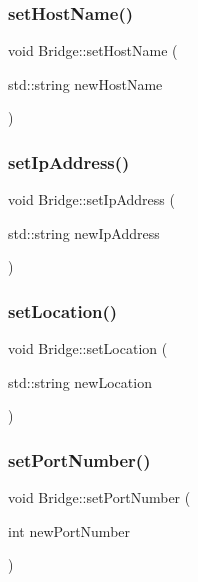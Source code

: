 \subsubsection{\texorpdfstring{set\+Host\+Name()}{setHostName()}}
{\footnotesize\ttfamily void Bridge\+::set\+Host\+Name (\begin{DoxyParamCaption}\item[{std\+::string}]{new\+Host\+Name }\end{DoxyParamCaption})\hspace{0.3cm}{\ttfamily [inline]}}

\mbox{\label{class_bridge_aa4fd7375d4b6092ca8bbee093dcc1a27}} 
\subsubsection{\texorpdfstring{set\+Ip\+Address()}{setIpAddress()}}
{\footnotesize\ttfamily void Bridge\+::set\+Ip\+Address (\begin{DoxyParamCaption}\item[{std\+::string}]{new\+Ip\+Address }\end{DoxyParamCaption})\hspace{0.3cm}{\ttfamily [inline]}}

\mbox{\label{class_bridge_a23bd543d54d8b90abfa1b441f3a526ca}} 
\subsubsection{\texorpdfstring{set\+Location()}{setLocation()}}
{\footnotesize\ttfamily void Bridge\+::set\+Location (\begin{DoxyParamCaption}\item[{std\+::string}]{new\+Location }\end{DoxyParamCaption})\hspace{0.3cm}{\ttfamily [inline]}}

\mbox{\label{class_bridge_a0acefccf95c0bf57465241ffe9618491}} 
\subsubsection{\texorpdfstring{set\+Port\+Number()}{setPortNumber()}}
{\footnotesize\ttfamily void Bridge\+::set\+Port\+Number (\begin{DoxyParamCaption}\item[{int}]{new\+Port\+Number }\end{DoxyParamCaption})\hspace{0.3cm}{\ttfamily [inline]}}

